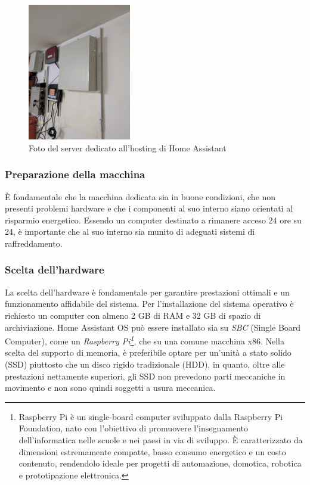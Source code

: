\documentclass[11pt, a4paper]{article}
\begin{document}
\begin{figure}
    
    \centering
    \includegraphics[width=0.4\textwidth]{media/server-home-assistant.jpg}
    \caption{Foto del server dedicato all'hosting di Home Assistant}
    \label{fig:server-dedicato}

\end{figure}

\subsubsection{Preparazione della macchina}
È fondamentale che la macchina dedicata sia in buone condizioni, che non presenti problemi hardware e che
i componenti al suo interno siano orientati al risparmio energetico. Essendo un computer destinato
a rimanere acceso 24 ore su 24, è importante che al suo interno sia munito di adeguati sistemi di raffreddamento.

\subsubsection{Scelta dell'hardware}
La scelta dell'hardware è fondamentale per garantire prestazioni ottimali e un funzionamento affidabile del sistema.
Per l'installazione del sistema operativo è richiesto un computer con almeno 2 GB di RAM e 32 GB di spazio di archiviazione.
Home Assistant OS può essere installato sia su \textit{SBC} (Single Board Computer), come un \textit{Raspberry Pi\footnote{
    Raspberry Pi è un single-board computer sviluppato dalla Raspberry Pi Foundation,
    nato con l'obiettivo di promuovere l'insegnamento dell'informatica nelle scuole e nei paesi in via di sviluppo.
    È caratterizzato da dimensioni estremamente compatte, basso consumo energetico e un costo contenuto,
    rendendolo ideale per progetti di automazione, domotica, robotica e prototipazione elettronica.
}}, 
che su una comune macchina x86.
Nella scelta del supporto di memoria, è preferibile optare per un'unità a stato solido (SSD) 
piuttosto che un disco rigido tradizionale (HDD),
in quanto, oltre alle prestazioni nettamente superiori, gli SSD non prevedono parti meccaniche in movimento e non sono quindi
soggetti a usura meccanica.
\end{document}
